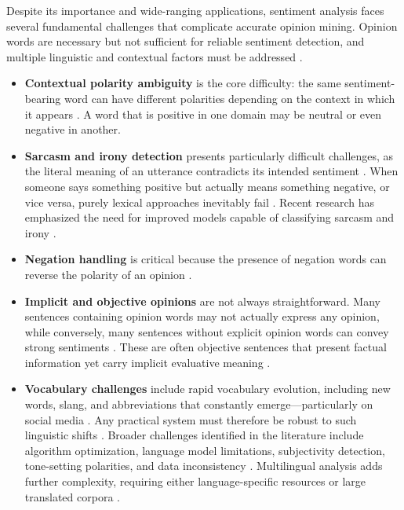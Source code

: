 \documentclass[a4paper,twoside,12pt]{book}
\begin{document}
Despite its importance and wide-ranging applications, sentiment analysis faces several fundamental challenges that complicate accurate opinion mining. Opinion words are necessary but not sufficient for reliable sentiment detection, and multiple linguistic and contextual factors must be addressed \cite{behdenna2018document}.

\begin{itemize}	
	\item \textbf{Contextual polarity ambiguity} is the core difficulty: the same sentiment-bearing word can have different polarities depending on the context in which it appears \cite{behdenna2018document}. A word that is positive in one domain may be neutral or even negative in another.
	
	\item \textbf{Sarcasm and irony detection} presents particularly difficult challenges, as the literal meaning of an utterance contradicts its intended sentiment \cite{behdenna2018document, islam2024challenges}. When someone says something positive but actually means something negative, or vice versa, purely lexical approaches inevitably fail \cite{behdenna2018document}. Recent research has emphasized the need for improved models capable of classifying sarcasm and irony \cite{islam2024challenges}.
	
	\item \textbf{Negation handling} is critical because the presence of negation words can reverse the polarity of an opinion \cite{behdenna2018document, islam2024challenges}.
	
	\item \textbf{Implicit and objective opinions} are not always straightforward. Many sentences containing opinion words may not actually express any opinion, while conversely, many sentences without explicit opinion words can convey strong sentiments \cite{behdenna2018document}. These are often objective sentences that present factual information yet carry implicit evaluative meaning \cite{behdenna2018document}.
	
	\item \textbf{Vocabulary challenges} include rapid vocabulary evolution, including new words, slang, and abbreviations that constantly emerge---particularly on social media \cite{sharma2025review}. Any practical system must therefore be robust to such linguistic shifts \cite{sharma2025review}. Broader challenges identified in the literature include algorithm optimization, language model limitations, subjectivity detection, tone-setting polarities, and data inconsistency \cite{sharma2025review}. Multilingual analysis adds further complexity, requiring either language-specific resources or large translated corpora \cite{sharma2025review}.
	
\end{itemize}
\end{document}
